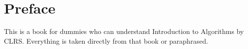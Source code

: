 \chapter{Preface}
This is a book for dummies who can understand Introduction to Algorithms by CLRS.
Everything is taken directly from that book or paraphrased.
